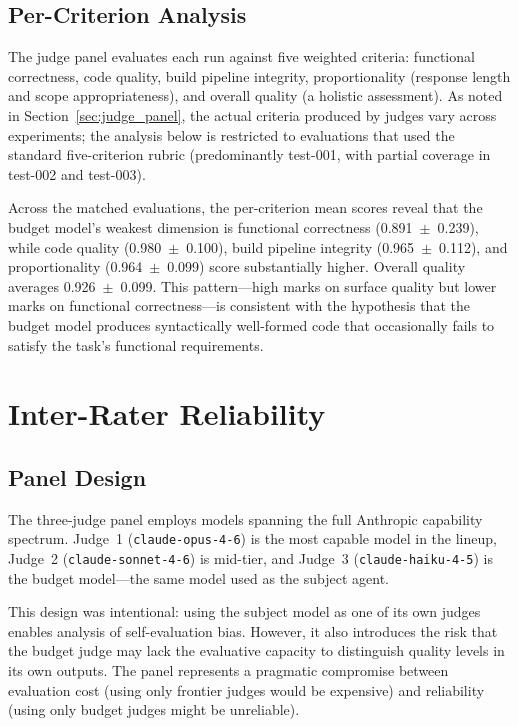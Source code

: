 \documentclass[11pt]{article}
\begin{document}
\subsection{Per-Criterion Analysis}
\label{sec:criteria}

The judge panel evaluates each run against five weighted criteria:
functional correctness, code quality, build pipeline integrity,
proportionality (response length and scope appropriateness), and overall
quality (a holistic assessment). As noted in
Section~\ref{sec:judge_panel}, the actual criteria produced by judges vary
across experiments; the analysis below is restricted to evaluations that
used the standard five-criterion rubric (predominantly test-001, with
partial coverage in test-002 and test-003).

Across the matched evaluations, the per-criterion mean scores reveal that the
budget model's weakest dimension is functional correctness
(0.891~$\pm$~0.239), while code quality (0.980~$\pm$~0.100), build pipeline
integrity (0.965~$\pm$~0.112), and proportionality (0.964~$\pm$~0.099) score
substantially higher. Overall quality averages 0.926~$\pm$~0.099. This
pattern---high marks on surface quality but lower marks on functional
correctness---is consistent with the hypothesis that the budget model produces
syntactically well-formed code that occasionally fails to satisfy the task's
functional requirements.

\section{Inter-Rater Reliability}
\label{sec:interrater}

\subsection{Panel Design}
\label{sec:panel_design}

The three-judge panel employs models spanning the full Anthropic capability
spectrum. Judge~1 (\texttt{claude-opus-4-6}) is the most capable model in the
lineup, Judge~2 (\texttt{claude-sonnet-4-6}) is mid-tier, and Judge~3
(\texttt{claude-haiku-4-5}) is the budget model---the same model used as the
subject agent.

This design was intentional: using the subject model as one of its own judges
enables analysis of self-evaluation bias. However, it also introduces the
risk that the budget judge may lack the evaluative capacity to distinguish
quality levels in its own outputs. The panel represents a pragmatic
compromise between evaluation cost (using only frontier judges would be
expensive) and reliability (using only budget judges might be unreliable).
\end{document}
